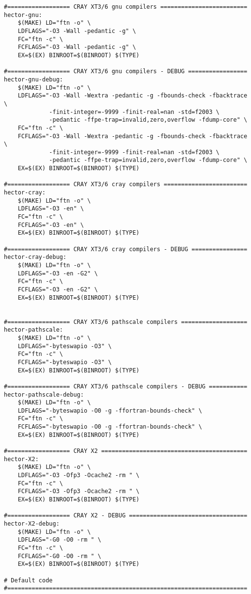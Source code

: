 \begin{verbatim}
#================== CRAY XT3/6 gnu compilers =========================
hector-gnu:
	$(MAKE) LD="ftn -o" \
	LDFLAGS="-O3 -Wall -pedantic -g" \
	FC="ftn -c" \
	FCFLAGS="-O3 -Wall -pedantic -g" \
	EX=$(EX) BINROOT=$(BINROOT) $(TYPE)

#================== CRAY XT3/6 gnu compilers - DEBUG =================
hector-gnu-debug:
	$(MAKE) LD="ftn -o" \
	LDFLAGS="-O3 -Wall -Wextra -pedantic -g -fbounds-check -fbacktrace \
	         -finit-integer=-9999 -finit-real=nan -std=f2003 \
	         -pedantic -ffpe-trap=invalid,zero,overflow -fdump-core" \
	FC="ftn -c" \
	FCFLAGS="-O3 -Wall -Wextra -pedantic -g -fbounds-check -fbacktrace \
	         -finit-integer=-9999 -finit-real=nan -std=f2003 \
	         -pedantic -ffpe-trap=invalid,zero,overflow -fdump-core" \
	EX=$(EX) BINROOT=$(BINROOT) $(TYPE)

#================== CRAY XT3/6 cray compilers ========================
hector-cray:
	$(MAKE) LD="ftn -o" \
	LDFLAGS="-O3 -en" \
	FC="ftn -c" \
	FCFLAGS="-O3 -en" \
	EX=$(EX) BINROOT=$(BINROOT) $(TYPE)

#================== CRAY XT3/6 cray compilers - DEBUG ================
hector-cray-debug:
	$(MAKE) LD="ftn -o" \
	LDFLAGS="-O3 -en -G2" \
	FC="ftn -c" \
	FCFLAGS="-O3 -en -G2" \
	EX=$(EX) BINROOT=$(BINROOT) $(TYPE)


#================== CRAY XT3/6 pathscale compilers ===================
hector-pathscale:
	$(MAKE) LD="ftn -o" \
	LDFLAGS="-byteswapio -O3" \
	FC="ftn -c" \
	FCFLAGS="-byteswapio -O3" \
	EX=$(EX) BINROOT=$(BINROOT) $(TYPE)

#================== CRAY XT3/6 pathscale compilers - DEBUG ===========
hector-pathscale-debug:
	$(MAKE) LD="ftn -o" \
	LDFLAGS="-byteswapio -O0 -g -ffortran-bounds-check" \
	FC="ftn -c" \
	FCFLAGS="-byteswapio -O0 -g -ffortran-bounds-check" \
	EX=$(EX) BINROOT=$(BINROOT) $(TYPE)

#================== CRAY X2 ==========================================
hector-X2:
	$(MAKE) LD="ftn -o" \
	LDFLAGS="-O3 -Ofp3 -Ocache2 -rm " \
	FC="ftn -c" \
	FCFLAGS="-O3 -Ofp3 -Ocache2 -rm " \
	EX=$(EX) BINROOT=$(BINROOT) $(TYPE)

#================== CRAY X2 - DEBUG ==================================
hector-X2-debug:
	$(MAKE) LD="ftn -o" \
	LDFLAGS="-G0 -O0 -rm " \
	FC="ftn -c" \
	FCFLAGS="-G0 -O0 -rm " \
	EX=$(EX) BINROOT=$(BINROOT) $(TYPE)

# Default code
#=====================================================================


\end{verbatim}
